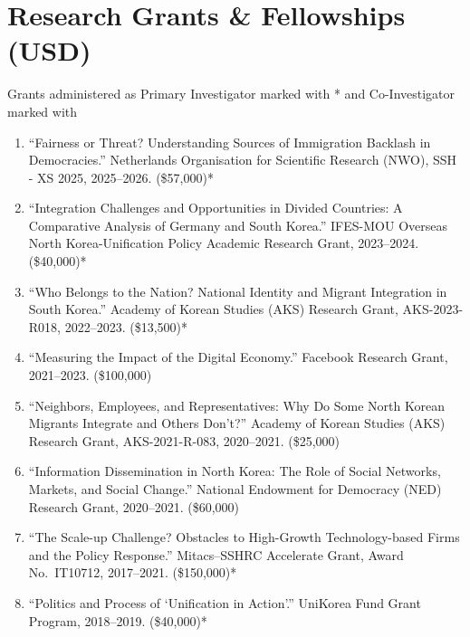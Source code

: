 \documentclass[11pt, a4paper]{article}
\begin{document}
\vfill
\endgroup

\newpage
\section{Research Grants \& Fellowships {\normalsize\normalfont(USD)}}

{\small Grants administered as Primary Investigator marked with * and Co-Investigator marked with \dag}

\vspace{0.2em}

\begin{enumerate}[itemsep=0.15em]
  \item ``Fairness or Threat? Understanding Sources of Immigration Backlash in Democracies.'' Netherlands Organisation for Scientific Research (NWO), SSH - XS 2025, 2025--2026. (\$57,000)*

  \item ``Integration Challenges and Opportunities in Divided Countries: A Comparative Analysis of Germany and South Korea.'' IFES-MOU Overseas North Korea-Unification Policy Academic Research Grant, 2023--2024. (\$40,000)*

  \item ``Who Belongs to the Nation? National Identity and Migrant Integration in South Korea.'' Academy of Korean Studies (AKS) Research Grant, AKS-2023-R018, 2022--2023. (\$13,500)*

  \item ``Measuring the Impact of the Digital Economy.'' Facebook Research Grant, 2021--2023. (\$100,000)\dag

  \item ``Neighbors, Employees, and Representatives: Why Do Some North Korean Migrants Integrate and Others Don't?'' Academy of Korean Studies (AKS) Research Grant, AKS-2021-R-083, 2020--2021. (\$25,000)\dag

  \item ``Information Dissemination in North Korea: The Role of Social Networks, Markets, and Social Change.'' National Endowment for Democracy (NED) Research Grant, 2020--2021. (\$60,000)\dag

  \item ``The Scale-up Challenge? Obstacles to High-Growth Technology-based Firms and the Policy Response.'' Mitacs--SSHRC Accelerate Grant, Award No.\ IT10712, 2017--2021. (\$150,000)*

  \item ``Politics and Process of `Unification in Action'.'' UniKorea Fund Grant Program, 2018--2019. (\$40,000)*


\end{enumerate}
\end{document}
